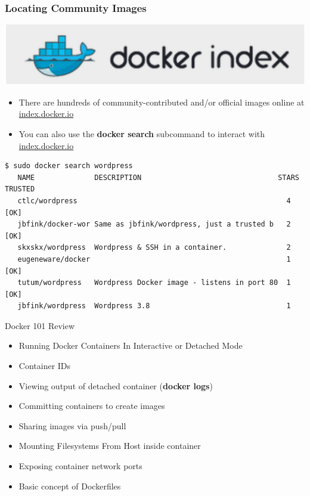 \documentclass[xcolor=dvipsnames]{beamer}
\begin{document}
\begin{frame}[fragile]
  \frametitle{Locating Community Images}

  \includegraphics[width=\textwidth]{figures/docker-index.pdf}

  \begin{itemize}
  \item There are hundreds of community-contributed and/or official images online at \url{index.docker.io}
  \item You can also use the \textbf{docker search} subcommand to interact with \url{index.docker.io}
  \end{itemize}

  \begin{lstlisting}[basicstyle=\tiny]
   $ sudo docker search wordpress
   NAME              DESCRIPTION                                STARS TRUSTED
   ctlc/wordpress                                                 4    [OK]
   jbfink/docker-wor Same as jbfink/wordpress, just a trusted b   2    [OK]
   skxskx/wordpress  Wordpress & SSH in a container.              2
   eugeneware/docker                                              1    [OK]
   tutum/wordpress   Wordpress Docker image - listens in port 80  1    [OK]
   jbfink/wordpress  Wordpress 3.8                                1
  \end{lstlisting}

\end{frame}

\begin{frame}{Docker 101 Review}  
  \begin{itemize}
  \item Running Docker Containers In Interactive or Detached Mode
  \item Container IDs
  \item Viewing output of detached container (\textbf{docker logs})
  \item Committing containers to create images
  \item Sharing images via push/pull
  \item Mounting Filesystems From Host inside container
  \item Exposing container network ports
  \item Basic concept of Dockerfiles
  \end{itemize}
\end{frame}
\end{document}
